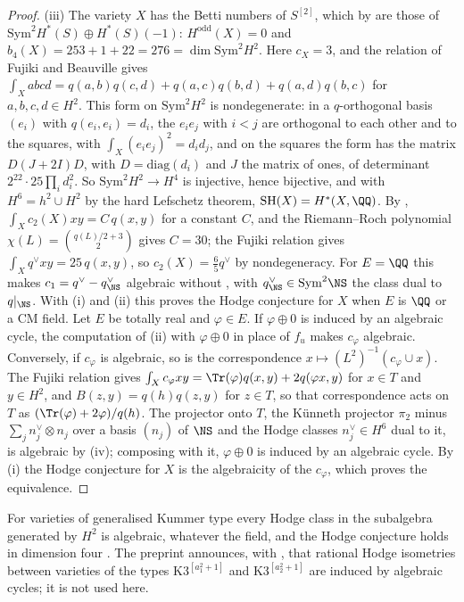 \begin{proof}
(iii) The variety $X$ has the Betti numbers of $S^{[2]}$, which by
\cite{dCM02} are those of $\mathrm{Sym}^{2}H^{*}(S)\oplus H^{*}(S)(-1)$:
$H^{\mathrm{odd}}(X)=0$ and $b_{4}(X)=253+1+22=276=\dim\mathrm{Sym}^{2}H^{2}$.
Here $c_{X}=3$, and the relation of Fujiki and Beauville gives
$\int_{X}abcd=q(a,b)q(c,d)+q(a,c)q(b,d)+q(a,d)q(b,c)$ for $a,b,c,d\in H^{2}$.
This form on $\mathrm{Sym}^{2}H^{2}$ is nondegenerate: in a $q$-orthogonal
basis $(e_{i})$ with $q(e_{i},e_{i})=d_{i}$, the $e_{i}e_{j}$ with $i<j$ are
orthogonal to each other and to the squares, with $\int_{X}(e_{i}e_{j})^{2}=
d_{i}d_{j}$, and on the squares the form has the matrix $D(J+2I)D$, with
$D=\mathrm{diag}(d_{i})$ and $J$ the matrix of ones, of determinant
$2^{22}\cdot25\prod_{i}d_{i}^{2}$. So
$\mathrm{Sym}^{2}H^{2}\to H^{4}$ is injective, hence bijective, and with
$H^{6}=h^{2}\cup H^{2}$ by the hard Lefschetz theorem,
$\mathrm{SH}(X)=H^{*}(X,\QQ)$. By \cite{Fuj87},
$\int_{X}c_{2}(X)xy=C\,q(x,y)$ for a constant $C$, and the Riemann--Roch
polynomial $\chi(L)=\binom{q(L)/2+3}{2}$ \cite{EGL01} gives $C=30$; the
Fujiki relation gives $\int_{X}q^{\vee}xy=25\,q(x,y)$, so
$c_{2}(X)=\frac65q^{\vee}$ by nondegeneracy. For $E=\QQ$ this makes
$c_{1}=q^{\vee}-q^{\vee}_{\NS}$ algebraic without \cite{CM13}, with
$q^{\vee}_{\NS}\in\mathrm{Sym}^{2}\NS$ the class dual to $q|_{\NS}$. With (i) and (ii) this proves the Hodge
conjecture for $X$ when $E$ is $\QQ$ or a CM field. Let $E$ be totally real
and $\varphi\in E$. If $\varphi\oplus0$ is induced by an algebraic cycle, the
computation of (ii) with $\varphi\oplus0$ in place of $f_{u}$ makes
$c_{\varphi}$ algebraic. Conversely, if $c_{\varphi}$ is algebraic, so is the
correspondence $x\mapsto(L^{2})^{-1}(c_{\varphi}\cup x)$. The Fujiki relation
gives $\int_{X}c_{\varphi}xy=\Tr(\varphi)q(x,y)+2q(\varphi x,y)$ for $x\in T$
and $y\in H^{2}$, and $B(z,y)=q(h)q(z,y)$ for $z\in T$, so that
correspondence acts on $T$ as $(\Tr(\varphi)+2\varphi)/q(h)$. The projector
onto $T$, the K\"unneth projector $\pi_{2}$ minus
$\sum_{j}n_{j}^{\vee}\otimes n_{j}$ over a basis $(n_{j})$ of $\NS$ and the
Hodge classes $n_{j}^{\vee}\in H^{6}$ dual to it, is algebraic by
(iv); composing with it, $\varphi\oplus0$ is induced by an
algebraic cycle. By (i) the Hodge conjecture for $X$ is the algebraicity of
the $c_{\varphi}$, which proves the equivalence.
\end{proof}

For varieties of generalised Kummer type every Hodge class in the subalgebra
generated by $H^{2}$ is algebraic, whatever the field, and the Hodge
conjecture holds in dimension four \cite{FV25}. The preprint \cite{OG26}
announces, with \cite{Mar24}, that rational Hodge isometries between
varieties of the types K3$^{[a_{1}^{2}+1]}$ and K3$^{[a_{2}^{2}+1]}$ are
induced by algebraic cycles; it is not used here.

